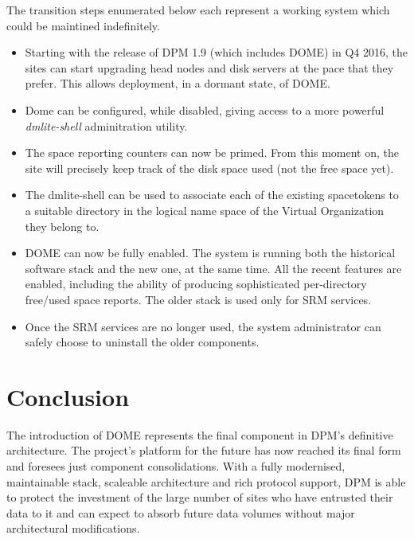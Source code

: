 \documentclass[a4paper]{jpconf}
\begin{document}
The transition steps enumerated below each represent a working system which could be maintined indefinitely.

\begin{itemize}
 \item Starting with the release of DPM 1.9 (which includes DOME) in Q4 2016, the sites can start upgrading
head nodes and disk servers at the pace that they prefer. This allows deployment, in a dormant state, of DOME. 
 \item Dome can be configured, while disabled, giving access to a more powerful \textit{dmlite-shell} adminitration utility.
 \item The space reporting counters can now be primed. From this moment on, the site will precisely keep track of the disk space used (not the free space yet).
 \item The dmlite-shell can be used to associate each of the existing spacetokens to a suitable directory
in the logical name space of the Virtual Organization they belong to.
 \item DOME can now be fully enabled.  The system is running both the historical software stack and the new one, at the same time.  All the recent features are enabled, including the ability of producing sophisticated per-directory free/used space reports. The older stack is used only for SRM services. 
 \item Once the SRM services are no longer used, the system administrator can safely choose to uninstall the older components.

\end{itemize}


\section{Conclusion}

The introduction of DOME represents the final component in DPM's definitive architecture. The project's
platform for the future has now reached its final form and foresees just component consolidations.
With a fully modernised, maintainable stack, scaleable architecture
and rich protocol support, DPM is able to protect the investment of the large number of sites who have
entrusted their data to it and can expect to absorb future data volumes without major architectural modifications.
\end{document}
